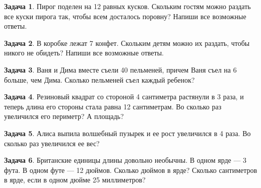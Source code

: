 \documentclass[14pt, a4paper]{extarticle}
\theoremstyle{definition}
\newtheorem{task}{Задача}
\begin{document}
\begin{task}
    Пирог поделен на 12 равных кусков. Скольким гостям можно раздать все куски пирога так, чтобы всем досталось поровну?
    Напиши все возможные ответы. 
\end{task}

\begin{task}
    В коробке лежат 7 конфет. Скольким детям можно их раздать, чтобы никого не обидеть?
    Напиши все возможные ответы.
\end{task}

\begin{task}
    Ваня и Дима вместе съели 40 пельменей, причем Ваня съел на 6 больше, чем Дима.
    Сколько пельменей съел каждый ребенок?
\end{task}

\begin{task}
    Резиновый квадрат со стороной 4 сантиметра растянули в 3 раза, и теперь длина
    его стороны стала равна 12 сантиметрам. Во сколько раз увеличился его
    периметр? А площадь?
\end{task}

\begin{task}
    Алиса выпила волшебный пузырек и ее рост увеличился в 4 раза. Во сколько
    раз увеличился ее вес?
\end{task}

\begin{task}
    Британские единицы длины довольно необычны. В одном ярде --- 3 фута. 
    В одном футе --- 12 дюймов. Сколько дюймов в ярде? Сколько сантиметров в ярде,
    если в одном дюйме 25 миллиметров?
\end{task}
\end{document}
